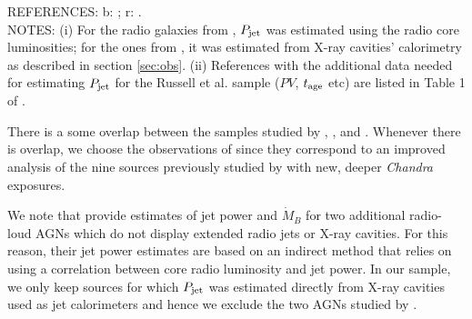 \documentclass[useAMS,usenatbib]{mn2e}
\begin{document}
\begin{table}
\begin{flushleft}
\footnotesize 
REFERENCES: b: \cite{Balmaverde08}; r: \cite{Russell13}. \\
NOTES: (i) For the radio galaxies from \cite{Balmaverde08}, $P_{\rm jet}$ was estimated using the radio core luminosities; for the ones from \cite{Russell13}, it was estimated from X-ray cavities' calorimetry as described in section \ref{sec:obs}.
(ii) References with the additional data needed for estimating $P_{\rm jet}$ for the Russell et al. sample ($PV$, $t_{\rm age}$ etc) are listed in Table 1 of \cite{Russell13}. 
\end{flushleft}
\label{tab:sample}
\end{table}


There is a some overlap between the samples studied by \cite{Rafferty06}, \cite{Allen06}, \cite{Merloni07} and \cite{Russell13}. Whenever there is overlap, we choose the observations of \cite{Russell13} since they correspond to an improved analysis of the nine sources previously studied by \cite{Allen06} with new, deeper \emph{Chandra} exposures. 

We note that \cite{Vattakunnel10} provide estimates of jet power and $\dot{M}_B$ for two additional radio-loud AGNs which do not display extended radio jets or X-ray cavities. For this reason, their jet power estimates are based on an indirect method that relies on using a correlation between core radio luminosity and jet power. In our sample, we only keep sources for which $P_{\rm jet}$ was estimated directly from X-ray cavities used as jet calorimeters and hence we exclude the two AGNs studied by \cite{Vattakunnel10}. 
\end{document}
